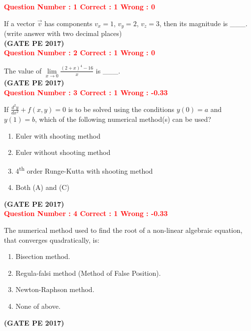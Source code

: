 \documentclass[journal,12pt,onecolumn]{article}
\begin{document}
{
\Large

\textcolor{red}{\textbf{Question Number : 1 \hfill Correct : 1  Wrong : 0}}

If a vector $\vec{v}$ has components $v_x = 1$, $v_y = 2$, $v_z = 3$, then its magnitude is \_\_\_.\\
(write answer with two decimal places)\\

\hfill\textbf{(GATE PE 2017)}\\[0.6cm]


\textcolor{red}{\textbf{Question Number : 2 \hfill Correct : 1  Wrong : 0}}

The value of 
{\LARGE$
\lim\limits_{x \to 0} \frac{(2 + x)^4 - 16}{x}
$ }
is \_\_\_.\\

\hfill\textbf{(GATE PE 2017)}\\[0.6cm]


\textcolor{red}{\textbf{Question Number : 3 \hfill Correct : 1  Wrong : -0.33}}

If 
{\LARGE$
\frac{d^2 y}{dx^2} + f(x, y) = 0
$}
is to be solved using the conditions $y(0) = a$ and $y(1) = b$, which of the following numerical method(s) can be used?

\begin{enumerate}[label=(\Alph*)]
    \item Euler with shooting method
    \item Euler without shooting method
    \item 4\textsuperscript{th} order Runge-Kutta with shooting method
    \item Both (A) and (C)
\end{enumerate}
\hfill\textbf{(GATE PE 2017)}\\[0.6cm]


\textcolor{red}{\textbf{Question Number : 4 \hfill Correct : 1  Wrong : -0.33}}

The numerical method used to find the root of a non-linear algebraic equation, that converges quadratically, is:

\begin{enumerate}[label=(\Alph*)]
    \item Bisection method.
    \item Regula-falsi method (Method of False Position).
    \item Newton-Raphson method.
    \item None of above.
\end{enumerate}
\hfill\textbf{(GATE PE 2017)}\\[0.6cm]



}
\end{document}
